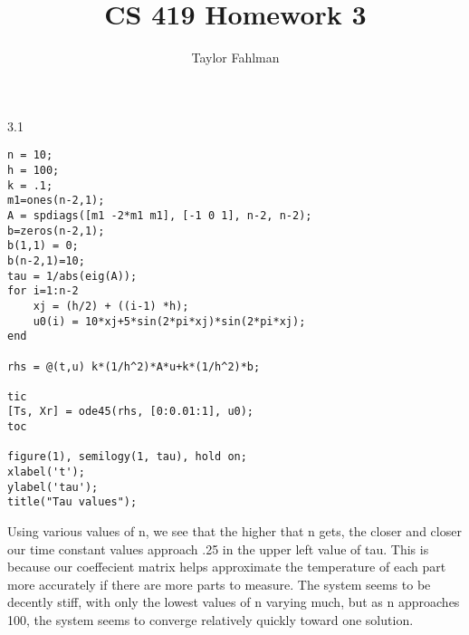 \documentclass{article}
\begin{document}
\title{CS 419 Homework 3}
\author{Taylor Fahlman}
\maketitle
\begin{flushleft}
3.1\\
\end{flushleft}

\begin{lstlisting}
n = 10;
h = 100;
k = .1;
m1=ones(n-2,1);
A = spdiags([m1 -2*m1 m1], [-1 0 1], n-2, n-2);
b=zeros(n-2,1);
b(1,1) = 0;
b(n-2,1)=10;
tau = 1/abs(eig(A));
for i=1:n-2
    xj = (h/2) + ((i-1) *h);
    u0(i) = 10*xj+5*sin(2*pi*xj)*sin(2*pi*xj);
end

rhs = @(t,u) k*(1/h^2)*A*u+k*(1/h^2)*b;

tic
[Ts, Xr] = ode45(rhs, [0:0.01:1], u0);
toc

figure(1), semilogy(1, tau), hold on;
xlabel('t');
ylabel('tau');
title("Tau values");

\end{lstlisting}
Using various values of n, we see that the higher that n gets, the closer and closer our
time constant values approach .25 in the upper left value of tau. This is because our coeffecient matrix helps approximate
the temperature of each part more accurately if there are more parts to measure. 
The system seems to be decently stiff, with only the lowest values of n varying much, but
as n approaches 100, the system seems to converge relatively quickly toward one solution.
\end{document}
